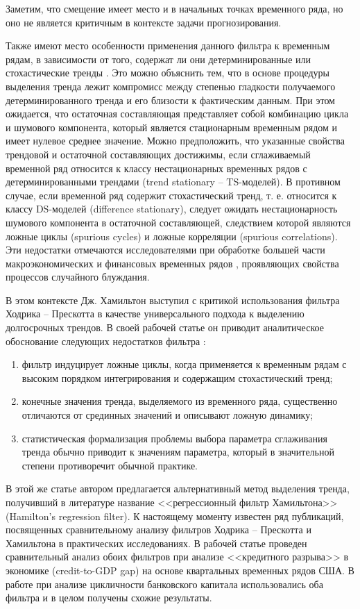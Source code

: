 \documentclass[a4paper,14pt]{extreport}
\begin{document}
	Заметим, что смещение имеет место и в начальных точках временного ряда, но оно не является критичным в контексте задачи прогнозирования.
	
	Также имеют место особенности применения данного фильтра к временным рядам, в зависимости от того, содержат ли они детерминированные или стохастические тренды \cite{kharin8}. Это можно объяснить тем, что в основе процедуры выделения тренда лежит компромисс между степенью гладкости получаемого детерминированного тренда и его близости к фактическим данным. При этом ожидается, что остаточная составляющая представляет собой комбинацию цикла и шумового компонента, который является стационарным временным рядом и имеет нулевое среднее значение. Можно предположить, что указанные свойства трендовой и остаточной составляющих достижимы, если сглаживаемый временной ряд относится к классу нестационарных временных рядов с детерминированными трендами (trend stationary – TS-моделей).  В противном случае, если временной ряд содержит стохастический тренд, т. е. относится к классу DS-моделей (difference stationary), следует ожидать нестационарность шумового компонента в остаточной составляющей, следствием которой являются ложные циклы (spurious cycles) и ложные корреляции (spurious correlations). Эти недостатки отмечаются исследователями при обработке большей части макроэкономических и финансовых временных рядов \cite{schuler_detrend, harvey_detrend, pederson_hp}, проявляющих свойства процессов случайного блуждания.
	
	В этом контексте Дж. Хамильтон выступил с критикой использования фильтра Ходрика – Прескотта в качестве универсального подхода к выделению долгосрочных трендов. В своей рабочей статье он приводит аналитическое обоснование следующих недостатков фильтра \cite{hamHP}:
	
	\begin{enumerate}
		\item фильтр индуцирует ложные циклы, когда применяется к временным рядам с высоким порядком интегрирования и содержащим стохастический тренд;
		\item конечные значения тренда, выделяемого из временного ряда, существенно отличаются от срединных значений и описывают ложную динамику;
		\item статистическая формализация проблемы выбора параметра сглаживания тренда обычно приводит к значениям параметра, который в значительной степени противоречит обычной практике.
	\end{enumerate}
	
	В этой же статье автором предлагается альтернативный метод выделения тренда, получивший в литературе название <<регрессионный фильтр Хамильтона>> (Hamilton's regression filter). К настоящему моменту известен ряд публикаций, посвященных сравнительному анализу фильтров Ходрика – Прескотта и Хамильтона в практических исследованиях. В рабочей статье \cite{schuler_detrend} проведен сравнительный анализ обоих фильтров при анализе <<кредитного разрыва>> в экономике (credit-to-GDP gap) на основе квартальных временных рядов США. В работе \cite{haubrich_cyc_bank} при анализе цикличности банковского капитала использовались оба фильтра и в целом получены схожие результаты.
	
\end{document}
